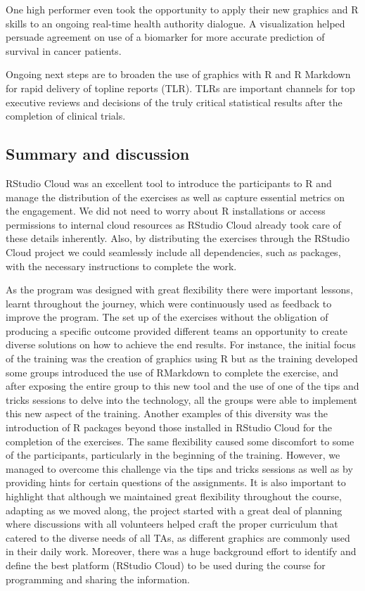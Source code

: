 One high performer even took the opportunity to apply their new graphics
and R skills to an ongoing real-time health authority dialogue. A
visualization helped persuade agreement on use of a biomarker for more
accurate prediction of survival in cancer patients.

Ongoing next steps are to broaden the use of graphics with R and R
Markdown for rapid delivery of topline reports (TLR). TLRs are important
channels for top executive reviews and decisions of the truly critical
statistical results after the completion of clinical trials.

\hypertarget{summary-and-discussion}{%
\subsection{Summary and discussion}\label{summary-and-discussion}}

RStudio Cloud was an excellent tool to introduce the participants to R
and manage the distribution of the exercises as well as capture
essential metrics on the engagement. We did not need to worry about R
installations or access permissions to internal cloud resources as
RStudio Cloud already took care of these details inherently. Also, by
distributing the exercises through the RStudio Cloud project we could
seamlessly include all dependencies, such as packages, with the
necessary instructions to complete the work.

As the program was designed with great flexibility there were important
lessons, learnt throughout the journey, which were continuously used as
feedback to improve the program. The set up of the exercises without the
obligation of producing a specific outcome provided different teams an
opportunity to create diverse solutions on how to achieve the end
results. For instance, the initial focus of the training was the
creation of graphics using R but as the training developed some groups
introduced the use of RMarkdown to complete the exercise, and after
exposing the entire group to this new tool and the use of one of the
tips and tricks sessions to delve into the technology, all the groups
were able to implement this new aspect of the training. Another examples
of this diversity was the introduction of R packages beyond those
installed in RStudio Cloud for the completion of the exercises. The same
flexibility caused some discomfort to some of the participants,
particularly in the beginning of the training. However, we managed to
overcome this challenge via the tips and tricks sessions as well as by
providing hints for certain questions of the assignments. It is also
important to highlight that although we maintained great flexibility
throughout the course, adapting as we moved along, the project started
with a great deal of planning where discussions with all volunteers
helped craft the proper curriculum that catered to the diverse needs of
all TAs, as different graphics are commonly used in their daily work.
Moreover, there was a huge background effort to identify and define the
best platform (RStudio Cloud) to be used during the course for
programming and sharing the information.

